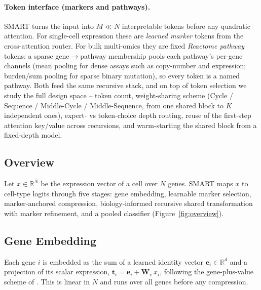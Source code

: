 \documentclass[letterpaper]{article}
\begin{document}
\paragraph{Token interface (markers and pathways).}
SMART turns the input into $M\ll N$ interpretable tokens before any quadratic
attention. For single-cell expression these are \emph{learned marker} tokens from the
cross-attention router. For bulk multi-omics they are fixed \emph{Reactome pathway}
tokens: a sparse gene$\to$pathway membership pools each pathway's per-gene channels
(mean pooling for dense assays such as copy-number and expression; burden/sum pooling
for sparse binary mutation), so every token is a named pathway. Both feed the same
recursive stack, and on top of token selection we study the full design space --
token count, weight-sharing scheme (Cycle / Sequence / Middle-Cycle / Middle-Sequence,
from one shared block to $K$ independent ones), expert- vs token-choice depth routing,
reuse of the first-step attention key/value across recursions, and warm-starting the
shared block from a fixed-depth model.


\subsection{Overview}
Let $x \in \mathbb{R}^{N}$ be the expression vector of a cell over $N$ genes. SMART
maps $x$ to cell-type logits through five stages: gene embedding, learnable marker
selection, marker-anchored compression, biology-informed recursive shared
transformation with marker refinement, and a pooled classifier
(Figure~\ref{fig:overview}).

\subsection{Gene Embedding}
Each gene $i$ is embedded as the sum of a learned identity vector
$\mathbf{e}_i \in \mathbb{R}^d$ and a projection of its scalar expression,
$\mathbf{t}_i = \mathbf{e}_i + \mathbf{W}_v\, x_i$, following the gene-plus-value
scheme of \cite{cui2024scgpt,theodoris2023transfer}. This is linear in $N$ and runs
over all genes before any compression.
\end{document}
